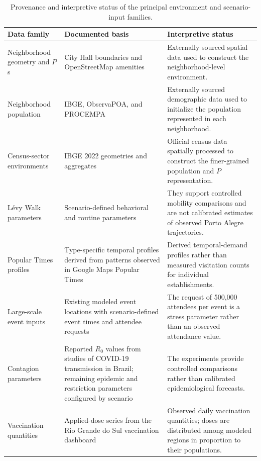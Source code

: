 \begin{table}[ht]
\centering
\footnotesize
\setlength{\tabcolsep}{4pt}
\caption{Provenance and interpretive status of the principal environment and scenario-input families.}
\label{tbl:simulation_data_provenance}
\begin{tabularx}{\linewidth}{@{}p{3.5cm}p{6.2cm}X@{}}
\toprule
\textbf{Data family} & \textbf{Documented basis} & \textbf{Interpretive status} \\
\midrule

Neighborhood geometry and $P$s
& City Hall boundaries and OpenStreetMap amenities
& Externally sourced spatial data used to construct the neighborhood-level environment. \\

Neighborhood population
& IBGE, ObservaPOA, and PROCEMPA
& Externally sourced demographic data used to initialize the population represented in each neighborhood. \\

Census-sector environments
& IBGE 2022 geometries and aggregates
& Official census data spatially processed to construct the finer-grained population and $P$ representation. \\

L\'evy Walk parameters
& Scenario-defined behavioral and routine parameters
& They support controlled mobility comparisons and are not calibrated estimates of observed Porto Alegre trajectories. \\

Popular Times profiles
& Type-specific temporal profiles derived from patterns observed in Google Maps Popular Times
& Derived temporal-demand profiles rather than measured visitation counts for individual establishments. \\

Large-scale event inputs
& Existing modeled event locations with scenario-defined event times and attendee requests
& The request of 500,000 attendees per event is a stress parameter rather than an observed attendance value. \\

Contagion parameters
& Reported $R_0$ values from studies of COVID-19 transmission in Brazil; remaining epidemic and restriction parameters configured by scenario
& The experiments provide controlled comparisons rather than calibrated epidemiological forecasts. \\

Vaccination quantities
& Applied-dose series from the Rio Grande do Sul vaccination dashboard
& Observed daily vaccination quantities; doses are distributed among modeled regions in proportion to their populations.\\


\end{tabularx}
\end{table}

